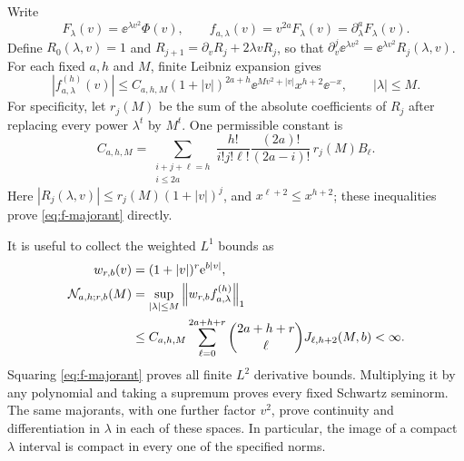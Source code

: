 Write
\begin{equation}
 F_\lambda(v)=\ee^{\lambda v^2}\Phi(v),\qquad
 f_{a,\lambda}(v)=v^{2a}F_\lambda(v)=\partial_\lambda^aF_\lambda(v).
 \label{eq:deformed-source}
\end{equation}
Define $R_0(\lambda,v)=1$ and
$R_{j+1}=\partial_vR_j+2\lambda vR_j$, so that
$\partial_v^j\ee^{\lambda v^2}=\ee^{\lambda v^2}R_j(\lambda,v)$.
For each fixed $a,h$ and $M$, finite Leibniz expansion gives
\begin{equation}
 |f_{a,\lambda}^{(h)}(v)|
 \le C_{a,h,M}(1+|v|)^{2a+h}
 \ee^{Mv^2+|v|}x^{h+2}\ee^{-x},\qquad |\lambda|\le M.
 \label{eq:f-majorant}
\end{equation}
For specificity, let $r_j(M)$ be the sum of the absolute coefficients
of $R_j$ after replacing every power $\lambda^t$ by $M^t$. One permissible
constant is
\begin{equation}
 C_{a,h,M}=\sum_{\substack{i+j+\ell=h\\i\le2a}}
 \frac{h!}{i!j!\ell!}\frac{(2a)!}{(2a-i)!}\,r_j(M)B_\ell.
 \label{eq:f-constant}
\end{equation}
Here $|R_j(\lambda,v)|\le r_j(M)(1+|v|)^j$, and
$x^{\ell+2}\le x^{h+2}$; these inequalities prove
\eqref{eq:f-majorant} directly.

It is useful to collect the weighted $L^1$ bounds as
\begin{align}
 w_{r,b}(v)&=(1+|v|)^r\mathrm e^{b|v|},\\
 \mathcal N_{a,h;r,b}(M)
 &=\sup_{|\lambda|\le M}\left\lVert w_{r,b}f_{a,\lambda}^{(h)}\right\rVert_1
 \nonumber\\
 &\le C_{a,h,M}\sum_{\ell=0}^{2a+h+r}
       \binom{2a+h+r}{\ell}J_{\ell,h+2}(M,b)<\infty.
 \label{eq:N-bound}
\end{align}
Squaring \eqref{eq:f-majorant} proves all finite $L^2$ derivative
bounds. Multiplying it by any polynomial and taking a supremum proves
every fixed Schwartz seminorm. The same majorants, with one further
factor $v^2$, prove continuity and differentiation in $\lambda$ in
each of these spaces. In particular, the image of a compact $\lambda$
interval is compact in every one of the specified norms.

